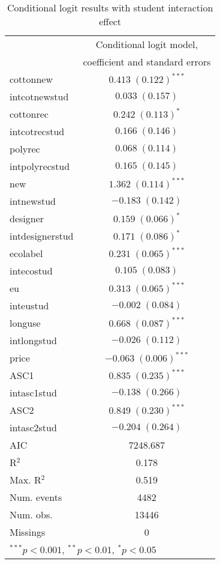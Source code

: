 \begin{table}[ht]
\begin{center}
\begin{tabular}{l c }
\hline
 & Conditional logit model,\\ & coefficient and standard errors \\
\hline
cottonnew       & $0.413 \; (0.122)^{***}$  \\
intcotnewstud   & $0.033 \; (0.157)$        \\
cottonrec       & $0.242 \; (0.113)^{*}$    \\
intcotrecstud   & $0.166 \; (0.146)$        \\
polyrec         & $0.068 \; (0.114)$        \\
intpolyrecstud  & $0.165 \; (0.145)$        \\
new             & $1.362 \; (0.114)^{***}$  \\
intnewstud      & $-0.183 \; (0.142)$       \\
designer        & $0.159 \; (0.066)^{*}$    \\
intdesignerstud & $0.171 \; (0.086)^{*}$    \\
ecolabel        & $0.231 \; (0.065)^{***}$  \\
intecostud      & $0.105 \; (0.083)$        \\
eu              & $0.313 \; (0.065)^{***}$  \\
inteustud       & $-0.002 \; (0.084)$       \\
longuse         & $0.668 \; (0.087)^{***}$  \\
intlongstud     & $-0.026 \; (0.112)$       \\
price           & $-0.063 \; (0.006)^{***}$ \\
ASC1            & $0.835 \; (0.235)^{***}$  \\
intasc1stud     & $-0.138 \; (0.266)$       \\
ASC2            & $0.849 \; (0.230)^{***}$  \\
intasc2stud     & $-0.204 \; (0.264)$       \\
\hline
AIC             & 7248.687                  \\
R$^2$           & 0.178                     \\
Max. R$^2$      & 0.519                     \\
Num. events     & 4482                      \\
Num. obs.       & 13446                     \\
Missings        & 0                         \\
\hline
\multicolumn{2}{l}{\scriptsize{$^{***}p<0.001$, $^{**}p<0.01$, $^*p<0.05$}}
\end{tabular}
\caption{Conditional logit results with student interaction effect}
\label{tab:ConditionalLogitModelStud}
\end{center}
\end{table}
